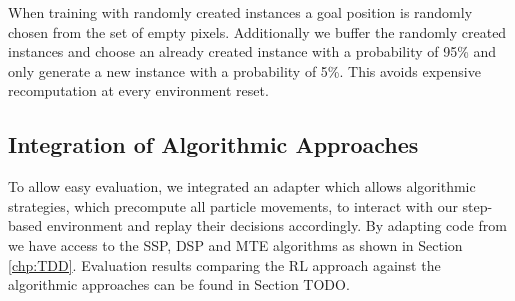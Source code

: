 When training with randomly created instances a goal position is randomly chosen from the set of empty pixels. Additionally we buffer the randomly created instances and choose an already created instance with a probability of 95\% and only generate a new instance with a probability of 5\%. This avoids expensive recomputation at every environment reset.

\subsection{Integration of Algorithmic Approaches} \label{sec:AlgorithmIntegration}
To allow easy evaluation, we integrated an adapter which allows algorithmic strategies, which precompute all particle movements, to interact with our step-based environment and replay their decisions accordingly. By adapting code from \cite{becker2020} we have access to the SSP, DSP and MTE algorithms as shown in Section \ref{chp:TDD}. Evaluation results comparing the RL approach against the algorithmic approaches can be found in Section TODO.

